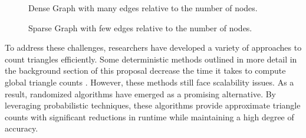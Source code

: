 \documentclass[11pt]{article}
\begin{document}
\begin{figure}[H]
    \centering
    \begin{minipage}{0.45\textwidth}
        \centering
        \caption{Dense Graph with many edges relative to the number of nodes.}
        \label{fig:dense_graph}
    \end{minipage}%
    \hspace{0.5cm}
    \begin{minipage}{0.45\textwidth}
        \centering
        \caption{Sparse Graph with few edges relative to the number of nodes.}
        \label{fig:sparse_graph}
    \end{minipage}
\end{figure}

To address these challenges, researchers have developed a variety of approaches to count triangles efficiently.
Some deterministic methods outlined in more detail in the background section of this proposal decrease the time it takes to compute global triangle counts \cite{strassen_gaussian_1969}.
However, these methods still face scalability issues.
As a result, randomized algorithms \cite{tsourakakis_doulion_2009, seshadhri_triadic_2013, tsourakakis_fast_2008} have emerged as a promising alternative.
By leveraging probabilistic techniques, these algorithms provide approximate triangle counts with significant reductions in runtime while maintaining a high degree of accuracy.
\end{document}

